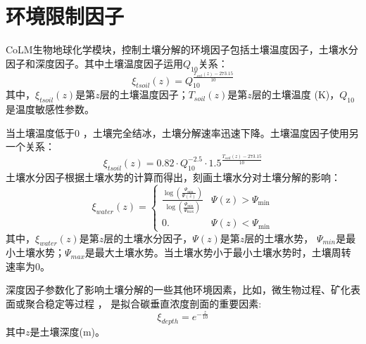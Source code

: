 \section{环境限制因子}\label{环境限制因子}
CoLM生物地球化学模块，控制土壤分解的环境因子包括土壤温度因子，土壤水分因子和深度因子。其中土壤温度因子运用$Q_{10}$关系：
\begin{equation}
\xi_{t s o i l}(z)=Q_{10}^{\frac{T_{{soil }}(z)-273.15}{10}}
\end{equation}
其中，$\xi_{tsoil}\left(z\right)$是第$z$层的土壤温度因子；$T_{soil}\left(z\right)$是第$z$层的土壤温度 (K)，$Q_{10}$是温度敏感性参数。


当土壤温度低于0 \textcelsius，土壤完全结冰，土壤分解速率迅速下降。土壤温度因子使用另一个关系：
\begin{equation}
\xi_{t s o i l}(z)=0.82 \cdot Q_{10}^{-2.5} \cdot 1.5^{\frac{T_{{soil }}(z)-273.15}{10}}
\end{equation}
土壤水分因子根据土壤水势的计算而得出，刻画土壤水分对土壤分解的影响：
\begin{equation}
\xi_{w a t e r}(z)=\left\{\begin{array}{ll}\frac{\log \left(\frac{\Psi_{\min }}{\Psi(z)}\right)}{\log \left(\frac{\Psi_{\min }}{\Psi_{\max }}\right)} 
    & \Psi(\mathrm{z})>\Psi_{\min } \\ 0 . & \Psi(z)<\Psi_{\min }\end{array}\right.
\end{equation}
其中，$\xi_{water}\left(z\right)$是第$z$层的土壤水分因子，$\Psi\left(z\right)$是第$z$层的土壤水势，
$\Psi_{min}$是最小土壤水势；$\Psi_{max}$是最大土壤水势。当土壤水势小于最小土壤水势时，土壤周转速率为0。


深度因子参数化了影响土壤分解的一些其他环境因素，比如，微生物过程、矿化表面或聚合稳定等过程 \citep{koven2013effect}，
是拟合碳垂直浓度剖面的重要因素\citep{jenkinson2008turnover}:
\begin{equation}
\xi_{d e p t h}=e^{-\frac{z}{10}}
\end{equation}
其中$z$是土壤深度(m)。

